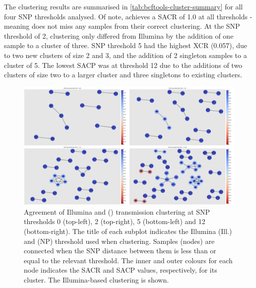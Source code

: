 The \bcftools{} clustering results are summarised in \autoref{tab:bcftools-cluster-summary} for all four SNP thresholds analysed. Of note, \bcftools{} achieves a SACR of 1.0 at all thresholds - meaning \ont{} does not miss any samples from their correct clustering. At the SNP threshold of 2, \bcftools{} clustering only differed from Illumina by the addition of one sample to a cluster of three.  SNP threshold 5 had the highest XCR (0.057), due to two new clusters of size 2 and 3, and the addition of 2 singleton samples to a cluster of 5.  The lowest SACP was at threshold 12 due to the additions of two clusters of size two to a larger cluster and three singletons to existing clusters. 

\begin{figure}
\begin{center}
\includegraphics[width=0.90\columnwidth]{Chapter2/Figs/bcftools_clusters.png}
\caption{{Agreement of Illumina and \bcftools{} (\ont{}) transmission clustering at SNP thresholds 0 (top-left), 2 (top-right), 5 (bottom-left) and 12 (bottom-right). The title of each subplot indicates the Illumina (Ill.) and \ont{} (NP) threshold used when clustering. Samples (nodes) are connected when the SNP distance between them is less than or equal to the relevant threshold. The inner and outer colours for each node indicates the SACR and SACP values, respectively, for its cluster. The Illumina-based clustering is shown.
{\label{fig:bcftools-clusters}}
}}
\end{center}
\end{figure}

